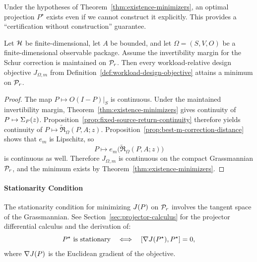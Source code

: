 \begin{corollary}
\label{cor:certification-existence}
Under the hypotheses of Theorem~\ref{thm:existence-minimizers}, an optimal projection $P^\star$ exists even if we cannot construct it explicitly.
This provides a ``certification without construction'' guarantee.
\end{corollary}

\begin{corollary}
\label{cor:workload-relative-minimizers}
Let \(\mathcal{H}\) be finite-dimensional, let \(A\) be bounded, and let
\(\Omega=(S,V,O)\) be a finite-dimensional observable package. Assume the
invertibility margin for the Schur correction is maintained on \(\mathcal{P}_{r}\).
Then every workload-relative design objective \(J_{\Omega,m}\) from
Definition~\ref{def:workload-design-objective} attains a minimum on
\(\mathcal{P}_{r}\).
\end{corollary}

\begin{proof}
The map \(P\mapsto O(I-P)\big|_S\) is continuous. Under the maintained
invertibility margin, Theorem~\ref{thm:existence-minimizers} gives continuity
of \(P\mapsto \Sigma_{P}(z)\). Proposition~\ref{prop:fixed-source-return-continuity}
therefore yields continuity of
\(P\mapsto \widetilde{\mathfrak R}_{\Omega}(P,A;z)\). Proposition~\ref{prop:best-m-correction-distance}
shows that \(e_m\) is Lipschitz, so
\[
P\longmapsto e_m\!\bigl(\widetilde{\mathfrak R}_{\Omega}(P,A;z)\bigr)
\]
is continuous as well. Therefore \(J_{\Omega,m}\) is continuous on the compact
Grassmannian \(\mathcal{P}_{r}\), and the minimum exists by
Theorem~\ref{thm:existence-minimizers}.
\end{proof}

\paragraph{Stationarity Condition}

The stationarity condition for minimizing $J(P)$ on $\mathcal{P}_{r}$ involves the tangent space of the Grassmannian.
See Section~\ref{sec:projector-calculus} for the projector differential calculus and the derivation of:
\[
P^\star \text{ is stationary} \quad \Longleftrightarrow \quad [\nabla J(P^\star), P^\star] = 0,
\]
where $\nabla J(P)$ is the Euclidean gradient of the objective.


